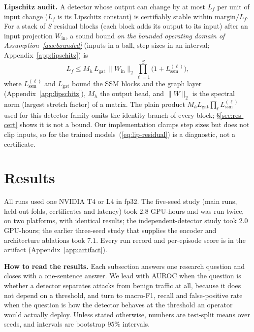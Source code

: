 \documentclass[conference,compsoc]{IEEEtran}
\begin{document}
\textbf{Lipschitz audit.} A detector whose output can change by at most $L_{f}$ per unit of input change ($L_{f}$ is its Lipschitz constant) is certifiably stable within margin$/L_{f}$. For a stack of $S$ residual blocks (each block adds its output to its input) after an input projection $W_{\text{in}}$, a sound bound \emph{on the bounded operating domain of Assumption~\ref{ass:bounded}} (inputs in a ball, step sizes in an interval; Appendix~\ref{app:lipschitz}) is
\begin{equation}
L_{f}\le M_{h}\,L_{\text{gat}}\,\lVert W_{\text{in}}\rVert_{2}\textstyle\prod_{\ell=1}^{S}\bigl(1+L^{(\ell)}_{\text{ssm}}\bigr),
\label{eq:lip-residual}
\end{equation}
where $L^{(\ell)}_{\text{ssm}}$ and $L_{\text{gat}}$ bound the SSM blocks and the graph layer (Appendix~\ref{app:lipschitz}), $M_{h}$ the output head, and $\lVert W\rVert_{2}$ is the spectral norm (largest stretch factor) of a matrix. The plain product $M_{h}L_{\text{gat}}\prod_{\ell}L^{(\ell)}_{\text{ssm}}$ used for this detector family omits the identity branch of every block; \S\ref{sec:res-cert} shows it is not a bound. Our implementation clamps step sizes but does not clip inputs, so for the trained models~(\ref{eq:lip-residual}) is a diagnostic, not a certificate.

\section{Results}
\label{sec:results}
All runs used one NVIDIA T4 or L4 in fp32. The five-seed study (main runs, held-out folds, certificates and latency) took $2.8$ GPU-hours and was run twice, on two platforms, with identical results; the independent-detector study took $2.0$ GPU-hours; the earlier three-seed study that supplies the encoder and architecture ablations took $7.1$. Every run record and per-episode score is in the artifact (Appendix~\ref{app:artifact}).

\textbf{How to read the results.} Each subsection answers one research question and closes with a one-sentence answer. We lead with AUROC when the question is whether a detector separates attacks from benign traffic at all, because it does not depend on a threshold, and turn to macro-F1, recall and false-positive rate when the question is how the detector behaves at the threshold an operator would actually deploy. Unless stated otherwise, numbers are test-split means over seeds, and intervals are bootstrap $95\%$ intervals.
\end{document}

